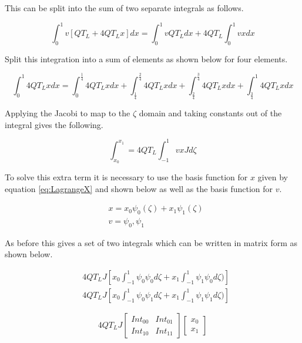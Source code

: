 \documentclass[11pt]{article}
\begin{document}
This can be split into the sum of two separate integrals as follows.

\begin{equation*}
\int_{0}^{1}v\left [ QT_L + 4QT_Lx \right ] dx = \int_{0}^{1}v QT_L dx + 4QT_L\int_{0}^{1}vx dx
\end{equation*}

Split this integration into a sum of elements as shown below for four elements.

\begin{equation*}
\int_0^1 4QT_Lx dx = \int_0^\frac{1}{4} 4QT_Lx dx + \int_\frac{1}{4}^\frac{2}{4}4QT_Lx  dx + \int_\frac{2}{4}^\frac{3}{4}  4QT_Lx dx + \int_\frac{3}{4}^1 4QT_Lx dx
\end{equation*}


Applying the Jacobi to map to the $\zeta$ domain and taking constants out of the integral gives the following.

\begin{equation} \label{eq:LinSJ}
\int_{x_0}^{x_1} = 4QT_L\int_{-1}^1 vxJ d\zeta
\end{equation}

To solve this extra term it is necessary to use the basis function for $x$ given by equation \ref{eq:LagrangeX} and shown below as well as the basis function for $v$.

\begin{align*}
&x = x_{0}\psi_{0}(\zeta) + x_1\psi_{1}(\zeta) \\
&v = \psi_{0}, \psi_{1}
\end{align*}

As before this gives a set of two integrals which can be written in matrix form as shown below.


\begin{subequations}
\label{eq:linSsim}
\begin{align}
&4QT_LJ \left  [x_0 \int_{-1}^{1} \psi_{0} \psi_{0} d \zeta + x_1 \int_{-1}^{1} \psi_{1} \psi_{0} d\zeta ) \right ] \label{eq:linsrow1} \\
&4QT_LJ  \left  [x_0 \int_{-1}^{1} \psi_{0} \psi_{1} d \zeta + x_1 \int_{-1}^{1} \psi_{1} \psi_{1} d\zeta ) \right ]  \label{eq:linsrow2} 
\end{align}
\end{subequations}



\begin{equation} \label{eq:linSmatrix}
4QT_LJ 
\begin{bmatrix}

Int_{00} & Int_{01} \\
Int_{10} & Int_{11}
\end{bmatrix}
\begin{bmatrix}

x_{0} \\  x_{1} 
\end{bmatrix}
\end{equation}
\end{document}
